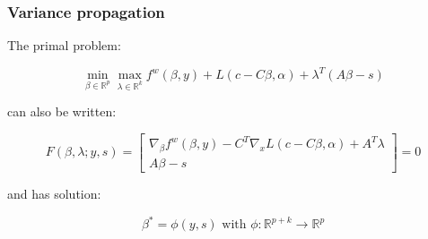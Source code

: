 \documentclass[aspectratio=169]{beamer}
\begin{document}
\begin{frame}
	\frametitle{Variance propagation}
	The primal problem:

	\begin{equation*}
	\min_{\beta \in \mathbb{R}^p} \max_{\lambda \in \mathbb{R}^k} f^w \left( \beta , y \right) + L \left( c - C \beta , \alpha \right) + \lambda^T \left( A \beta - s \right) 
	\end{equation*}

	can also be written:

	\begin{equation*}
	F \left( \beta , \lambda ; y , s \right) = \begin{bmatrix} \nabla_\beta f^w \left( \beta , y \right) - C^T \nabla_x L \left( c - C \beta , \alpha \right) + A^T \lambda \\ A \beta - s \end{bmatrix} = 0
	\end{equation*}

	and has solution:

	\begin{equation*}
	\beta^* = \phi \left( y , s \right) \text{ with } \phi : \mathbb{R}^{p+k} \rightarrow \mathbb{R}^p
	\end{equation*}
\end{frame}
\end{document}
